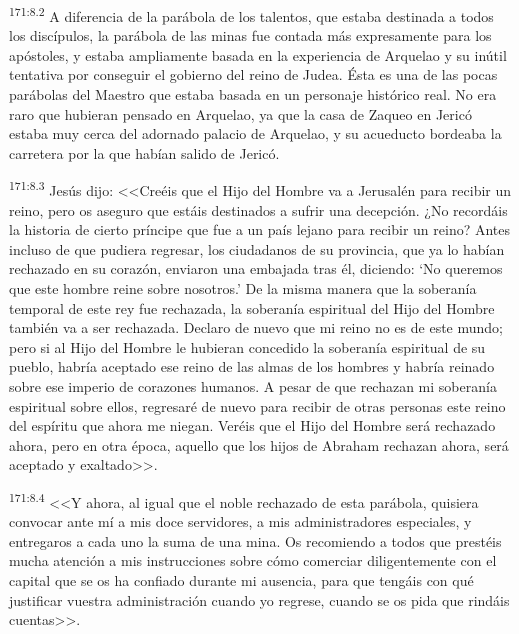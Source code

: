 \par 
\textsuperscript{171:8.2} A diferencia de la parábola de los talentos, que estaba destinada a todos los discípulos, la parábola de las minas fue contada más expresamente para los apóstoles, y estaba ampliamente basada en la experiencia de Arquelao y su inútil tentativa por conseguir el gobierno del reino de Judea. Ésta es una de las pocas parábolas del Maestro que estaba basada en un personaje histórico real. No era raro que hubieran pensado en Arquelao, ya que la casa de Zaqueo en Jericó estaba muy cerca del adornado palacio de Arquelao, y su acueducto bordeaba la carretera por la que habían salido de Jericó.

\par 
\textsuperscript{171:8.3} Jesús dijo: <<Creéis que el Hijo del Hombre va a Jerusalén para recibir un reino, pero os aseguro que estáis destinados a sufrir una decepción. ¿No recordáis la historia de cierto príncipe que fue a un país lejano para recibir un reino? Antes incluso de que pudiera regresar, los ciudadanos de su provincia, que ya lo habían rechazado en su corazón, enviaron una embajada tras él, diciendo: `No queremos que este hombre reine sobre nosotros.' De la misma manera que la soberanía temporal de este rey fue rechazada, la soberanía espiritual del Hijo del Hombre también va a ser rechazada. Declaro de nuevo que mi reino no es de este mundo; pero si al Hijo del Hombre le hubieran concedido la soberanía espiritual de su pueblo, habría aceptado ese reino de las almas de los hombres y habría reinado sobre ese imperio de corazones humanos. A pesar de que rechazan mi soberanía espiritual sobre ellos, regresaré de nuevo para recibir de otras personas este reino del espíritu que ahora me niegan. Veréis que el Hijo del Hombre será rechazado ahora, pero en otra época, aquello que los hijos de Abraham rechazan ahora, será aceptado y exaltado>>.

\par 
\textsuperscript{171:8.4} <<Y ahora, al igual que el noble rechazado de esta parábola, quisiera convocar ante mí a mis doce servidores, a mis administradores especiales, y entregaros a cada uno la suma de una mina. Os recomiendo a todos que prestéis mucha atención a mis instrucciones sobre cómo comerciar diligentemente con el capital que se os ha confiado durante mi ausencia, para que tengáis con qué justificar vuestra administración cuando yo regrese, cuando se os pida que rindáis cuentas>>.

